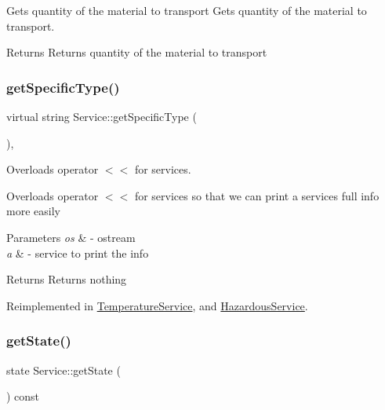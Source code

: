 Gets quantity of the material to transport Gets quantity of the material to transport. 

\begin{DoxyReturn}{Returns}
Returns quantity of the material to transport 
\end{DoxyReturn}
\mbox{\label{class_service_a4e833f8d8688facfe0858eb4299660e8}} 
\subsubsection{\texorpdfstring{get\+Specific\+Type()}{getSpecificType()}}
{\footnotesize\ttfamily virtual string Service\+::get\+Specific\+Type (\begin{DoxyParamCaption}{ }\end{DoxyParamCaption})\hspace{0.3cm}{\ttfamily [inline]}, {\ttfamily [virtual]}}



Overloads operator $<$$<$ for services. 

Overloads operator $<$$<$ for services so that we can print a service\textquotesingle{}s full info more easily


\begin{DoxyParams}{Parameters}
{\em os} & -\/ ostream \\
\hline
{\em a} & -\/ service to \textquotesingle{}print\textquotesingle{} the info \\
\hline
\end{DoxyParams}
\begin{DoxyReturn}{Returns}
Returns nothing 
\end{DoxyReturn}


Reimplemented in \hyperlink{class_temperature_service_afe119e9c22598d454c7355a49f984df5}{Temperature\+Service}, and \hyperlink{class_hazardous_service_a683cc101557a61d0ac6c36cbe67bf6c2}{Hazardous\+Service}.

\mbox{\label{class_service_adf7f337e38c8de87e82b42f15c7ccad3}} 
\subsubsection{\texorpdfstring{get\+State()}{getState()}}
{\footnotesize\ttfamily state Service\+::get\+State (\begin{DoxyParamCaption}{ }\end{DoxyParamCaption}) const}



